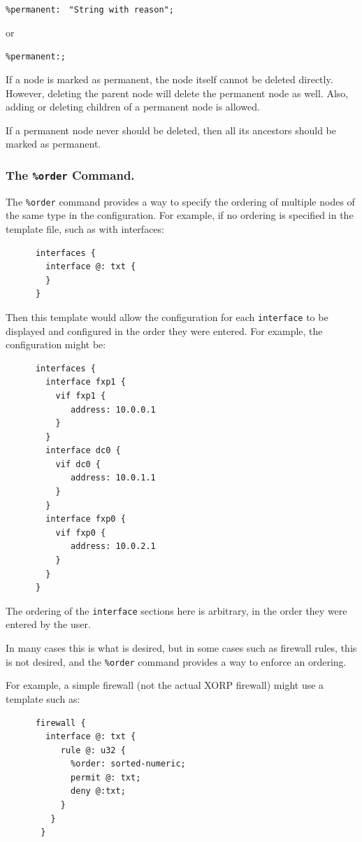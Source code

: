 \documentclass[11pt]{article}
\begin{document}
\texttt{\%permanent: } \texttt{"String with reason"}\texttt{;}

or

\texttt{\%permanent:;}

If a node is marked as permanent, the node itself cannot be deleted
directly. However, deleting the parent node will delete the permanent
node as well. Also, adding or deleting children of a permanent node
is allowed.

If a permanent node never should be deleted, then all its ancestors
should be marked as permanent.

\subsubsection{The {\tt \%order} Command.}

The {\tt \%order} command provides a way to specify the ordering of
multiple nodes of the same type in the configuration.  For example, if
no ordering is specified in the template file, such as with interfaces:

\begin{verbatim}
      interfaces {
        interface @: txt {
        }
      }
\end{verbatim}

\noindent Then this template would allow the configuration for each
{\tt interface} to be displayed and configured in the order they were
entered.  For example, the configuration might be:

\begin{verbatim}
      interfaces {
        interface fxp1 {
          vif fxp1 {
             address: 10.0.0.1
          }
        }
        interface dc0 {
          vif dc0 {
             address: 10.0.1.1
          }
        }
        interface fxp0 {
          vif fxp0 {
             address: 10.0.2.1
          }
        }
      }
\end{verbatim}

\noindent The ordering of the {\tt interface} sections here is
arbitrary, in the order they were entered by the user.

\noindent In many cases this is what is desired, but in some cases such as
firewall rules, this is not desired, and the {\tt \%order} command
provides a way to enforce an ordering.

\noindent For example, a simple firewall (not the actual XORP firewall) might
use a template such as:

\begin{verbatim}
      firewall {
        interface @: txt {
           rule @: u32 {
             %order: sorted-numeric;
             permit @: txt;
             deny @:txt;
           }
         }
       }
\end{verbatim}
\end{document}
